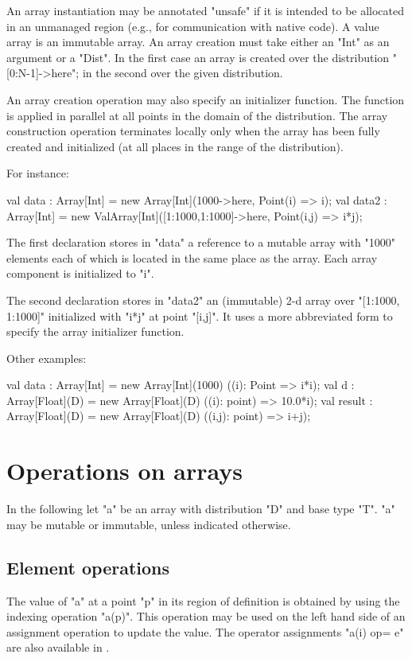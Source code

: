 An array instantiation may be annotated
\xcd"unsafe"
if it is intended to be
allocated in an unmanaged region (e.g., for communication with native
code). A value array is an immutable array. An array creation
must take either an \xcd"Int" as an argument or a \xcd"Dist". In the first
case an array is created over the distribution \xcd"[0:N-1]->here";
in the second over the given distribution. 

An array creation operation may also specify an initializer
function.
The function is applied in parallel
at all points in the domain of the distribution. The array
construction operation terminates locally only when the array has been
fully created and initialized (at all places in the range of the
distribution).

For instance:
\begin{xten}
val data : Array[Int]
    = new Array[Int](1000->here, Point(i) => i);
val data2 : Array[Int]
    = new ValArray[Int]([1:1000,1:1000]->here, Point(i,j) => i*j);
\end{xten}

{}\noindent 
The first declaration stores in \xcd"data" a reference to a mutable
array with \xcd"1000" elements each of which is located in the
same place as the array. Each array component is initialized to \xcd"i".

The second declaration stores in \xcd"data2" an (immutable)
2-d array over \xcd"[1:1000, 1:1000]" initialized with \xcd"i*j"
at point \xcd"[i,j]". It uses a more abbreviated form to specify 
the array initializer function.

Other examples:
\begin{xten}
val data : Array[Int]
    = new Array[Int](1000) ((i): Point => i*i);
val d : Array[Float](D)
   = new Array[Float](D) ((i): point) => 10.0*i);
val result : Array[Float](D)
   = new Array[Float](D) ((i,j): point) => i+j);
\end{xten}

\section{Operations on arrays}
In the following let \xcd"a" be an array with distribution \xcd"D" and
base type \xcd"T". \xcd"a" may be mutable or immutable, unless
indicated otherwise.

\subsection{Element operations}
The value of \xcd"a" at a point \xcd"p" in its region of definition is
obtained by using the indexing operation \xcd"a(p)". This operation
may be used on the left hand side of an assignment operation to update
the value. The operator assignments \xcd"a(i) op= e" are also available
in \Xten{}.

